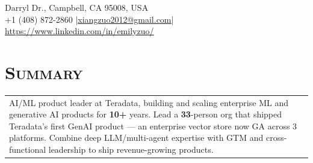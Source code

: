 \documentclass[letterpaper,11pt]{article} %
\begin{document}
\pagestyle{empty} %


\vspace*{-8mm}
\par{\par} %

 Darryl Dr., Campbell, CA 95008, USA\\
    +1 (408) 872-2860 \hspace{2 mm}|\hspace{2 mm}\href{mailto:xiangzuo2012@gmail.com}{\underline{xiangzuo2012@gmail.com}}\hspace{2 mm}|\hspace{2mm}\href{https://www.linkedin.com/in/emilyzuo/}{ \hspace{1 mm}\underline{https://www.linkedin.com/in/emilyzuo/}}

\section{\Large\bf\textsc{Summary}}
\begin{tabular}{p{18.5cm}}
AI/ML product leader at Teradata, building and scaling enterprise ML and generative AI products for \textbf{10+} years. Lead a \textbf{33}-person org that shipped Teradata's first GenAI product — an enterprise vector store now GA across 3 platforms. Combine deep LLM/multi-agent expertise with GTM and cross-functional leadership to ship revenue-growing products.
\end{tabular}
\vspace{-1mm}
\end{document}
